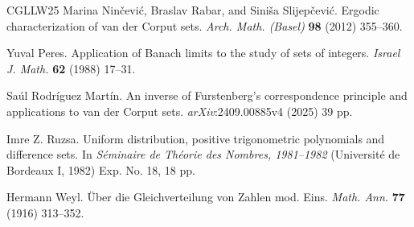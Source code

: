\documentclass[11pt]{amsart}
\theoremstyle{theorem}
\theoremstyle{definition}
\begin{document}
\begin{thebibliography}{CGLLW25}
Marina Nin\v{c}evi\'{c}, Braslav Rabar, and Sini\v{s}a Slijep\v{c}evi\'{c}.
\newblock	Ergodic characterization of van der Corput sets.
\newblock	\emph{Arch. Math. (Basel)} \textbf{98} (2012) 355--360.

Yuval Peres.
\newblock   Application of Banach limits to the study of sets of integers.
\newblock   \emph{Israel J. Math.} \textbf{62} (1988) 17--31.

Sa\'{u}l Rodr\'{i}guez Mart\'{i}n.
\newblock   An inverse of Furstenberg’s correspondence principle and applications to van der Corput sets.
\newblock   \emph{arXiv}:2409.00885v4 (2025) 39 pp.

Imre Z. Ruzsa.
\newblock	Uniform distribution, positive trigonometric polynomials and difference sets.
\newblock	In \emph{S\'{e}minaire de Th\'{e}orie des Nombres, 1981--1982} (Université de Bordeaux I, 1982) Exp. No. 18, 18 pp.

Hermann Weyl.
\newblock	\"{U}ber die Gleichverteilung von Zahlen mod. Eins.
\newblock	\emph{Math. Ann.} \textbf{77} (1916) 313--352.

\end{thebibliography}
\end{document}
